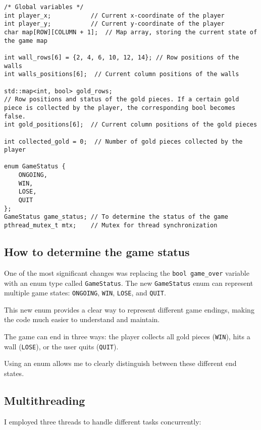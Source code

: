 \documentclass{article}
\begin{document}
\begin{lstlisting}
/* Global variables */
int player_x;           // Current x-coordinate of the player
int player_y;           // Current y-coordinate of the player
char map[ROW][COLUMN + 1];  // Map array, storing the current state of the game map

int wall_rows[6] = {2, 4, 6, 10, 12, 14}; // Row positions of the walls
int walls_positions[6];  // Current column positions of the walls

std::map<int, bool> gold_rows;
// Row positions and status of the gold pieces. If a certain gold piece is collected by the player, the corresponding bool becomes false.
int gold_positions[6];  // Current column positions of the gold pieces

int collected_gold = 0;  // Number of gold pieces collected by the player

enum GameStatus {
    ONGOING, 
    WIN,      
    LOSE,     
    QUIT      
};
GameStatus game_status; // To determine the status of the game
pthread_mutex_t mtx;    // Mutex for thread synchronization
\end{lstlisting}

\subsection{How to determine the game status}
One of the most significant changes was replacing the \texttt{bool game\_over} variable with an enum type called \texttt{GameStatus}. 
The new \texttt{GameStatus} enum can represent multiple game states: \texttt{ONGOING}, \texttt{WIN}, \texttt{LOSE}, and \texttt{QUIT}.

This new enum provides a clear way to represent different game endings, making the code much easier to understand and maintain.

The game can end in three ways: the player collects all gold pieces (\texttt{WIN}), hits a wall (\texttt{LOSE}), or the user quits (\texttt{QUIT}). 

Using an enum allows me to clearly distinguish between these different end states.

\subsection{Multithreading}
I employed three threads to handle different tasks concurrently:
\end{document}
